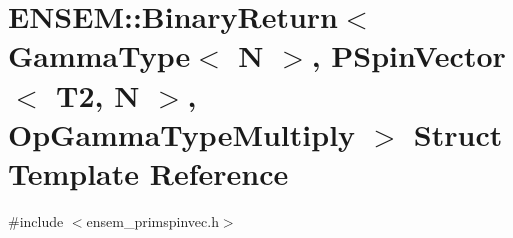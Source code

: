 \hypertarget{structENSEM_1_1BinaryReturn_3_01GammaType_3_01N_01_4_00_01PSpinVector_3_01T2_00_01N_01_4_00_01OpGammaTypeMultiply_01_4}{}\section{E\+N\+S\+EM\+:\+:Binary\+Return$<$ Gamma\+Type$<$ N $>$, P\+Spin\+Vector$<$ T2, N $>$, Op\+Gamma\+Type\+Multiply $>$ Struct Template Reference}
\label{structENSEM_1_1BinaryReturn_3_01GammaType_3_01N_01_4_00_01PSpinVector_3_01T2_00_01N_01_4_00_01OpGammaTypeMultiply_01_4}


{\ttfamily \#include $<$ensem\+\_\+primspinvec.\+h$>$}

